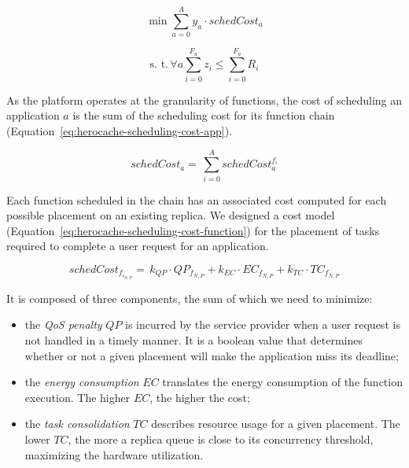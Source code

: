 \begin{equation}
    \min \sum_{a = 0}^{A} y_a \cdot schedCost_{a}
\label{eq:herocache-objective-scheduling}
\end{equation}

\begin{equation}
    \text{s. t.} \, \forall a \sum_{i = 0}^{F_a} z_i \leq \sum_{i = 0}^{F_a} R_{i}
\label{eq:herocache-constraint-scheduling}
\end{equation}


As the platform operates at the granularity of functions, the cost of scheduling an application $a$ is the sum of the scheduling cost for its function chain (Equation~\ref{eq:herocache-scheduling-cost-app}).

\begin{equation}
    schedCost_{a} = \, \sum_{i = 0}^{A} schedCost^{{{f}_{i}}}_{a}
\label{eq:herocache-scheduling-cost-app}
\end{equation}

Each function scheduled in the chain has an associated cost computed for each possible placement on an existing replica.
We designed a cost model (Equation~\ref{eq:herocache-scheduling-cost-function}) for the placement of tasks required to complete a user request for an application. 

\begin{equation}
    schedCost_{{f}_{{i}_{N, P}}} = \, k_{QP} \cdot QP_{{f}_{N, P}} + k_{EC} \cdot {EC}_{{f}_{N, P}} + k_{TC} \cdot TC_{{f}_{N, P}}
\label{eq:herocache-scheduling-cost-function}
\end{equation}

It is composed of three components, the sum of which we need to minimize:

\begin{itemize}
    \item the \textit{QoS penalty} $QP$ is incurred by the service provider when a user request is not handled in a timely manner. It is a boolean value that determines whether or not a given placement will make the application miss its deadline;
    \item the \textit{energy consumption} $EC$ translates the energy consumption of the function execution. The higher $EC$, the higher the cost;
    \item the \textit{task consolidation} $TC$ describes resource usage for a given placement. The lower $TC$, the more a replica queue is close to its concurrency threshold, maximizing the hardware utilization.
\end{itemize}

